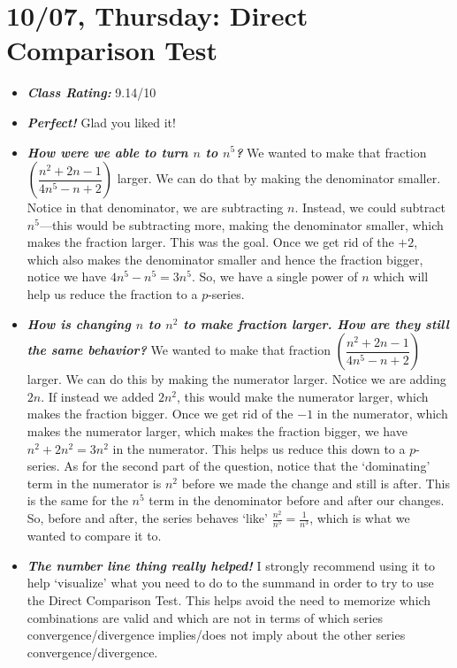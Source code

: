 \documentclass[11pt,letterpaper]{article}
\begin{document}
\section*{10/07, Thursday: Direct Comparison Test\label{10-07}}

\begin{itemize}
\item {\bfseries\itshape Class Rating:} 9.14/10

\item {\bfseries\itshape Perfect!} Glad you liked it!

\item {\bfseries\itshape How were we able to turn $n$ to $n^5$?} We wanted to make that fraction $\left( \dfrac{n^2 + 2n - 1}{4n^5 - n + 2} \right)$ larger. We can do that by making the denominator smaller. Notice in that denominator, we are subtracting $n$. Instead, we could subtract $n^5$---this would be subtracting more, making the denominator smaller, which makes the fraction larger. This was the goal. Once we get rid of the $+2$, which also makes the denominator smaller and hence the fraction bigger, notice we have $4n^5 - n^5= 3n^5$. So, we have a single power of $n$ which will help us reduce the fraction to a $p$-series. 

\item {\bfseries\itshape How is changing $n$ to $n^2$ to make fraction larger. How are they still the same behavior?} We wanted to make that fraction $\left( \dfrac{n^2 + 2n - 1}{4n^5 - n + 2} \right)$ larger. We can do this by making the numerator larger. Notice we are adding $2n$. If instead we added $2n^2$, this would make the numerator larger, which makes the fraction bigger. Once we get rid of the $-1$ in the numerator, which makes the numerator larger, which makes the fraction bigger, we have $n^2 + 2n^2= 3n^2$ in the numerator. This helps us reduce this down to a $p$-series. As for the second part of the question, notice that the `dominating' term in the numerator is $n^2$ before we made the change and still is after. This is the same for the $n^5$ term in the denominator before and after our changes. So, before and after, the series behaves `like' $\frac{n^2}{n^5}= \frac{1}{n^3}$, which is what we wanted to compare it to. 

\item {\bfseries\itshape The number line thing really helped!} I strongly recommend using it to help `visualize' what you need to do to the summand in order to try to use the Direct Comparison Test. This helps avoid the need to memorize which combinations are valid and which are not in terms of which series convergence/divergence implies/does not imply about the other series convergence/divergence. 


\end{itemize}
\end{document}
